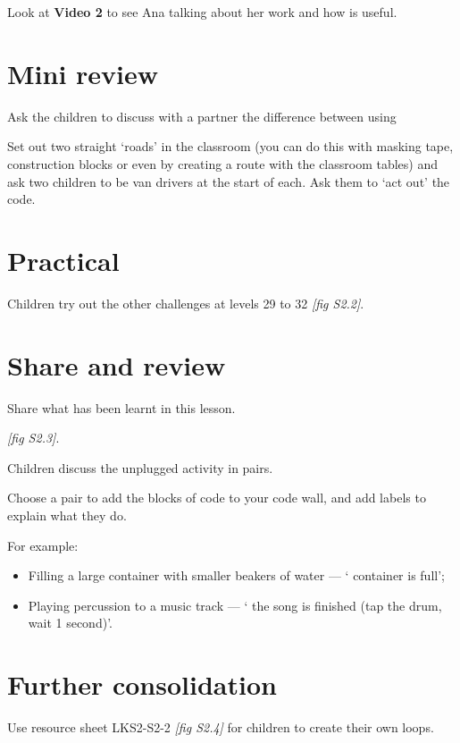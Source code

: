 \documentclass{../../../lessonplan}
\begin{document}
\begin{lessonplan}
Look at \textbf{Video 2} to see Ana talking about her work and how  is useful.

\section*{Mini review}

Ask the children to discuss with a partner the difference between using 

Set out two straight `roads' in the classroom (you can do this with masking tape, construction blocks or even by creating a route with the classroom tables) and ask two children to be van drivers at the start of each.
Ask them to `act out' the code.

\section*{Practical}


Children try out the other challenges at levels 29 to 32 \textit{[fig S2.2]}.

\section*{Share and review}

Share what has been learnt in this lesson.

 \textit{[fig S2.3]}.

Children discuss the unplugged activity in pairs.

Choose a pair to add the  blocks of code to your code wall, and add labels to explain what they do.



For example:
\begin{itemize}
  \item Filling a large container with smaller beakers of water --- ` container is full';
  \item Playing percussion to a music track --- ` the song is finished (tap the drum, wait 1 second)'.
\end{itemize}

\section*{Further consolidation}

Use resource sheet LKS2-S2-2 \textit{[fig S2.4]} for children to create their own  loops.


\end{lessonplan}
\end{document}
